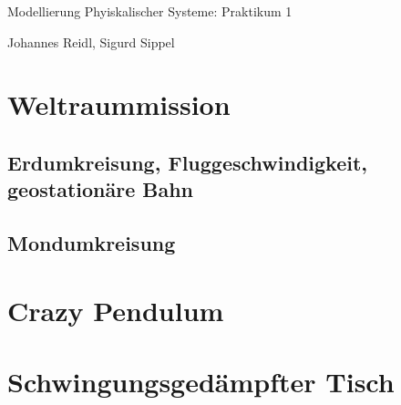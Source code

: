 \documentclass[10pt,a4paper]{article}
\begin{document}
\begin{center}
Modellierung Phyiskalischer Systeme: Praktikum 1

Johannes Reidl, Sigurd Sippel

\end{center}

\section{Weltraummission}

\subsection{Erdumkreisung, Fluggeschwindigkeit, geostationäre Bahn}

\subsection{Mondumkreisung}


\section{Crazy Pendulum}

\section{Schwingungsgedämpfter Tisch}
\end{document}
